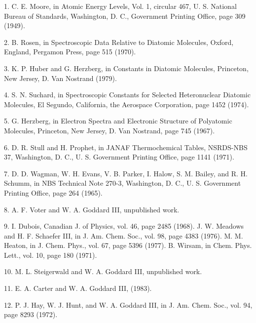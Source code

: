 
\item {1.} C. E. Moore, in Atomic Energy Levels, Vol. 1, circular 
467, U. S. National Bureau of Standards, Washington, D. C., Government 
Printing Office, page 309 (1949).

\item {2.} B. Rosen, in Spectroscopic Data Relative to Diatomic 
Molecules, Oxford, England, Pergamon Press, page 515 (1970).

\item {3.} K. P. Huber and G. Herzberg, in Constants in Diatomic 
Molecules, Princeton, New Jersey, D. Van Nostrand (1979).

\item {4.} S. N. Suchard, in Spectroscopic Constants for Selected 
Heteronuclear Diatomic Molecules, El Segundo, California, the 
Aerospace Corporation, page 1452 (1974).

\item {5.} G. Herzberg, in Electron Spectra and Electronic Structure 
of Polyatomic Molecules, Princeton, New Jersey, D. Van Nostrand, page 
745 (1967).

\item {6.} D. R. Stull and H. Prophet, in JANAF Thermochemical 
Tables, NSRDS-NBS 37, Washington, D. C., U. S. Government Printing 
Office, page 1141 (1971).

\item {7.} D. D. Wagman, W. H. Evans, V. B. Parker, I. Halow, S. M. 
Bailey, and R. H. Schumm, in NBS Technical Note 270-3, Washington, D. 
C., U. S. Government Printing Office, page 264 (1965).

\item {8.} A. F. Voter and W. A. Goddard III, unpublished work.

\item {9.} I. Dubois, Canadian J. of Physics, vol. 46, page 2485 
(1968).  J. W. Meadows and H. F. Schaefer III, in J. Am. Chem. Soc., 
vol. 98, page 4383 (1976).  M. M. Heaton, in J. Chem. Phys., vol. 67, 
page 5396 (1977).  B. Wirsam, in Chem. Phys. Lett., vol. 10, page 180 
(1971).

\item {10.} M. L. Steigerwald and W. A. Goddard III, unpublished work.

\item {11.} E. A. Carter and W. A. Goddard III, (1983).

\item {12.} P. J. Hay, W. J. Hunt, and W. A. Goddard III, in J. Am. 
Chem. Soc., vol. 94, page 8293 (1972).

